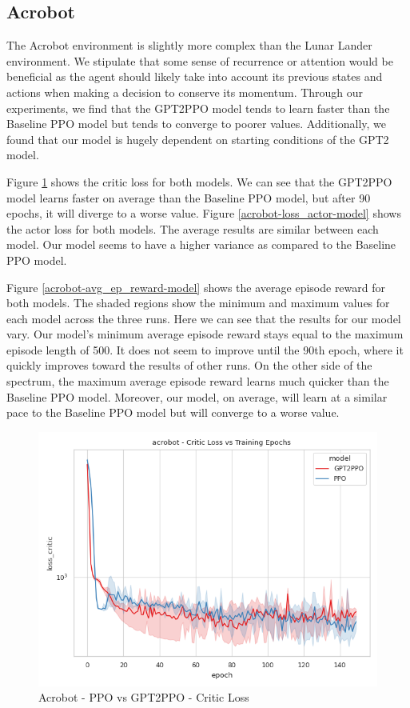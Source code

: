 \documentclass[conference]{IEEEtran}
\begin{document}
\subsection{Acrobot}
The Acrobot environment is slightly more complex than the Lunar Lander environment. We stipulate that some sense of recurrence or attention would be beneficial as the agent should likely take into account its previous states and actions when making a decision to conserve its momentum. Through our experiments, we find that the GPT2PPO model tends to learn faster than the Baseline PPO model but tends to converge to poorer values. Additionally, we found that our model is hugely dependent on starting conditions of the GPT2 model.

Figure \ref{acrobot-loss_critic-model} shows the critic loss for both models. We can see that the GPT2PPO model learns faster on average than the Baseline PPO model, but after 90 epochs, it will diverge to a worse value. Figure \ref{acrobot-loss_actor-model} shows the actor loss for both models. The average results are similar between each model. Our model seems to have a higher variance as compared to the Baseline PPO model.

Figure \ref{acrobot-avg_ep_reward-model} shows the average episode reward for both models. The shaded regions show the minimum and maximum values for each model across the three runs. Here we can see that the results for our model vary. Our model's minimum average episode reward stays equal to the maximum episode length of 500. It does not seem to improve until the 90th epoch, where it quickly improves toward the results of other runs. On the other side of the spectrum, the maximum average episode reward learns much quicker than the Baseline PPO model. Moreover, our model, on average, will learn at a similar pace to the Baseline PPO model but will converge to a worse value.

\begin{figure}[htbp]
    \centerline{\includegraphics[width=\columnwidth]{./img/acrobot-loss_critic-model.png}}
    \caption{Acrobot - PPO vs GPT2PPO - Critic Loss}
    \label{acrobot-loss_critic-model}
\end{figure}
\end{document}
